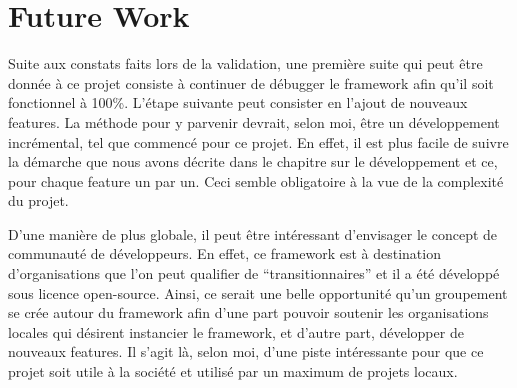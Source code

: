 \section{Future Work}

Suite aux constats faits lors de la validation,  une première suite qui peut être donnée à ce projet consiste à continuer de débugger le framework afin qu'il soit fonctionnel à 100\%.  L'étape suivante peut consister en l'ajout de nouveaux features.  La méthode pour y parvenir devrait,  selon moi,  être un développement incrémental,  tel que commencé pour ce projet. En effet,  il est plus facile de suivre la démarche que nous avons décrite dans le chapitre sur le développement et ce,  pour chaque feature un par un.  Ceci semble obligatoire à la vue de la complexité du projet.  

D'une manière de plus globale,  il peut être intéressant d'envisager le concept de communauté de développeurs.  En effet,  ce framework est à destination d'organisations que l'on peut qualifier de ``transitionnaires'' et il a été développé sous licence open-source.  Ainsi,  ce serait une belle opportunité qu'un groupement se crée autour du framework afin d'une part pouvoir soutenir les organisations locales qui désirent instancier le framework,  et d'autre part,  développer de nouveaux features.  Il s'agit là,  selon moi,  d'une piste intéressante pour que ce projet soit utile à la société et utilisé par un maximum de projets locaux.  

